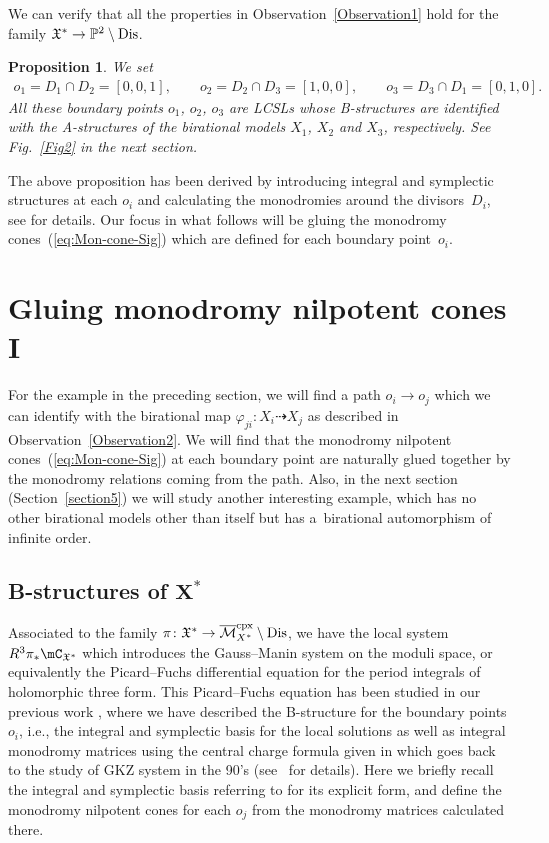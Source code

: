 \documentclass[pdftex]{sigma}
\numberwithin{equation}{section}
\newtheorem{Proposition}[Theorem]{Proposition}
\begin{document}
We can verify that all the properties in Observation~\ref{Observation1} hold for the family $\mathfrak{X}^{*}\to\mathbb{P}^{2}\setminus {\rm Dis}$.
\begin{Proposition}We set
\begin{gather*}
o_{1}=D_{1}\cap D_{2}=[0,0,1],\qquad o_{2}=D_{2}\cap D_{3}=[1,0,0],\qquad o_{3}=D_{3}\cap D_{1}=[0,1,0].
\end{gather*}
All these boundary points $o_{1}$, $o_{2}$, $o_{3}$ are LCSLs whose B-structures are identified with the A-structures of the birational models $X_{1}$, $X_{2}$ and $X_{3}$, respectively. See Fig.~{\rm \ref{Fig2}} in the next section.
\end{Proposition}

The above proposition has been derived by introducing integral and symplectic structures at each $o_{i}$ and calculating the monodromies around the divisors~$D_{i}$, see \cite[Section~6.3]{HTcmp} for details. Our focus in what follows will be gluing the monodromy cones~(\ref{eq:Mon-cone-Sig}) which are defined for each boundary point~$o_{i}$.

\section{Gluing monodromy nilpotent cones I} \label{sec:Gluing-monod-I}

For the example in the preceding section, we will find a path $o_{i}\to o_{j}$ which we can identify with the birational map $\varphi_{ji}\colon X_{i}\dashrightarrow X_{j}$ as described in Observation~\ref{Observation2}. We will find that the monodromy nilpotent cones~(\ref{eq:Mon-cone-Sig}) at each boundary point are naturally glued together by the monodromy relations coming from the path. Also, in the next section (Section~\ref{section5}) we will study another interesting example, which has no other birational models other than itself but has a~birational automorphism of infinite order.

\subsection[B-structures of $X^{*}$]{B-structures of $\boldsymbol{X^{*}}$} \label{sub:B-str-Reye}

Associated to the family $\pi\colon \mathfrak{X}^{*}\to\overline{\mathcal{M}}_{X^{*}}^{\rm cpx}\setminus {\rm Dis}$, we have the local system $R^{3}\pi_{*}\mC_{\mathfrak{X}^{*}}$ which introduces the Gauss--Manin system on the moduli space, or equivalently the Picard--Fuchs differential equation for the period integrals of holomorphic three form. This Picard--Fuchs equation has been studied in our previous work \cite{HTcmp}, where we have described the B-structure for the boundary points $o_{i}$, i.e., the integral and symplectic basis for the local solutions as well as integral monodromy matrices using the central charge formula given in \cite{IIAmonod,CentralCh} which goes back to the study of GKZ system \cite{GKZ1} in the 90's (see~\cite{HKTY,HLY} for details). Here we briefly recall the integral and symplectic basis referring to \cite{HTcmp} for its explicit form, and define the monodromy nilpotent cones for each $o_{j}$ from the monodromy matrices calculated there.
\end{document}
